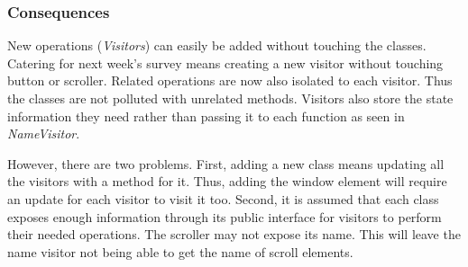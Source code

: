 \subsubsection{Consequences}
New operations (\textit{Visitors}) can easily be added without touching the classes.
Catering for next week's survey means creating a new visitor without touching button or scroller.
Related operations are now also isolated to each visitor.
Thus the classes are not polluted with unrelated methods.
Visitors also store the state information they need rather than passing it to each function as seen in \textit{NameVisitor}.

However, there are two problems.
First, adding a new class means updating all the visitors with a method for it.
Thus, adding the window element will require an update for each visitor to visit it too.
Second, it is assumed that each class exposes enough information through its public interface for visitors to perform their needed operations.
The scroller may not expose its name.
This will leave the name visitor not being able to get the name of scroll elements.